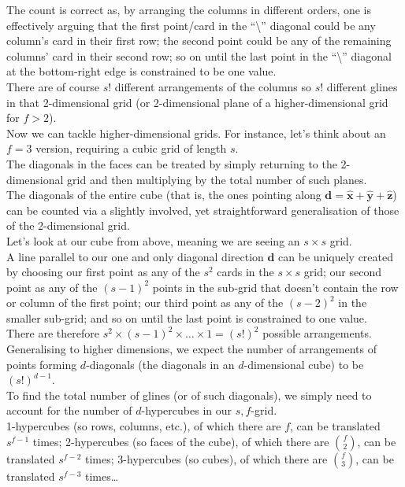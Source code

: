\documentclass{article}
\theoremstyle{definition}
\theoremstyle{remark}
\begin{document}
The count is correct as, by arranging the columns in different orders, one is effectively arguing that the first point/card in the ``\textbackslash'' diagonal could be any column's card in their first row; the second point could be any of the remaining columns' card in their second row; so on until the last point in the ``\textbackslash'' diagonal at the bottom-right edge is constrained to be one value.\\
There are of course $s!$ different arrangements of the columns so $s!$ different glines in that 2-dimensional grid (or 2-dimensional plane of a higher-dimensional grid for $f>2$).\\
Now we can tackle higher-dimensional grids. For instance, let's think about an $f=3$ version, requiring a cubic grid of length $s$.\\
The diagonals in the faces can be treated by simply returning to the 2-dimensional grid and then multiplying by the total number of such planes.\\
The diagonals of the entire cube (that is, the ones pointing along $\mathbf{d}=\hat{\mathbf{x}}+\hat{\mathbf{y}}+\hat{\mathbf{z}}$) can be counted via a slightly involved, yet straightforward generalisation of those of the 2-dimensional grid.\\
Let's look at our cube from above, meaning we are seeing an $s\times s$ grid.\\
A line parallel to our one and only diagonal direction $\mathbf{d}$ can be uniquely created by choosing our first point as any of the $s^2$ cards in the $s\times s$ grid; our second point as any of the $(s-1)^2$ points in the sub-grid that doesn't contain the row or column of the first point; our third point as any of the $(s-2)^2$ in the smaller sub-grid; and so on until the last point is constrained to one value.\\
There are therefore $s^2\times (s-1)^2\times\dots\times 1=(s!)^2$ possible arrangements.\\
Generalising to higher dimensions, we expect the number of arrangements of points forming $d$-diagonals (the diagonals in an $d$-dimensional cube) to be $(s!)^{d-1}$.\\
To find the total number of glines (or of such diagonals), we simply need to account for the number of $d$-hypercubes in our $s,f$-grid.\\
1-hypercubes (so rows, columns, etc.), of which there are $f$, can be translated $s^{f-1}$ times; 2-hypercubes (so faces of the cube), of which there are $\binom{f}{2}$, can be translated $s^{f-2}$ times; 3-hypercubes (so cubes), of which there are $\binom{f}{3}$, can be translated $s^{f-3}$ times\dots\\
\end{document}
